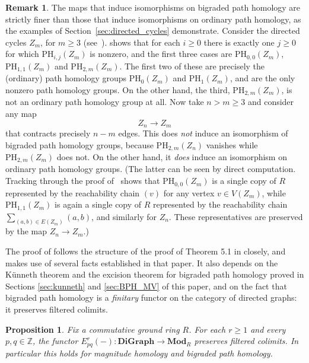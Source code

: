 \documentclass[a4paper, 11 pt, oneside, reqno]{amsart}
\numberwithin{lemma}{section}
\newtheorem{proposition}[lemma]{Proposition}
\theoremstyle{definition}
\newtheorem{remark}[lemma]{Remark}
\newcommand{\mathbbZ}{\mathbb{Z}}
\newcommand{\cn}[1]{\mathbf{#1}}
\newcommand{\PH}{\mathrm{PH}}
\newcommand{\MPSS}{E}
\begin{document}
\begin{remark}\label{rmk:compare-cofibration-categories}
    The maps that induce isomorphisms on bigraded path homology
    are strictly finer than those that induce isomorphisms
    on ordinary path homology, as the examples
    of Section~\ref{sec:directed_cycles} demonstrate.
    Consider the directed cycles
    $Z_m$, for $m\geq 3$ (see~).
     shows that 
    for each $i\geq 0$ there is exactly one $j\geq 0$ for which
    $\PH_{i,j}(Z_m)$ is nonzero, 
    and the first three cases are 
    $\PH_{0,0}(Z_m)$, $\PH_{1,1}(Z_m)$ and $\PH_{2,m}(Z_m)$.
    The first two of these are precisely the (ordinary) path
    homology groups $\PH_0(Z_m)$ and $\PH_1(Z_m)$,
    and are the only nonzero path homology groups.
    On the other hand, the third, $\PH_{2,m}(Z_m)$,
    is not an ordinary path homology group at all.
    Now take $n>m\geq 3$ and consider any map
    \[
        Z_n\longrightarrow Z_m
    \]
    that contracts precisely $n-m$ edges.
    This does \emph{not} induce an isomorphism 
    of bigraded path homology groups, 
    because $\PH_{2,m}(Z_n)$ vanishes while $\PH_{2,m}(Z_m)$
    does not.
    On the other hand, it \emph{does} induce an isomorphism 
    on ordinary path homology groups.
    (The latter can be seen by direct computation.
    Tracking through the proof of~ shows that
    $\PH_{0,0}(Z_m)$ is a single copy of $R$
    represented by the reachability chain $(v)$ for any vertex
    $v\in V(Z_m)$, 
    while $\PH_{1,1}(Z_m)$ is again a single copy of $R$
    represented by the reachability chain 
    $\sum_{(a,b)\in E(Z_m)}(a,b)$,
    and similarly for $Z_n$.
    These representatives are preserved by the map $Z_n\to Z_m$.)
\end{remark}


The proof of  follows the structure of the proof of Theorem 5.1 in \cite{CDKOSW} closely, and makes use of several facts established in that paper. It also depends on the K\"unneth theorem and the excision theorem for bigraded path homology proved in Sections \ref{sec:kunneth} and \ref{sec:BPH_MV} of this paper, and on the fact that bigraded path homology is a \emph{finitary} functor on the category of directed graphs: it preserves filtered colimits.

\begin{proposition}
\label{thm:MPSS_filtered_colimits}
    Fix a commutative ground ring \(R\). For each \(r \geq 1\) and every \(p,q \in \mathbbZ\), the functor 
    \(\MPSS^r_{pq}(-)\colon \cn{DiGraph} \to \cn{Mod}_R\)
    preserves filtered colimits. In particular this holds for magnitude homology and bigraded path homology.
\end{proposition}
\end{document}
